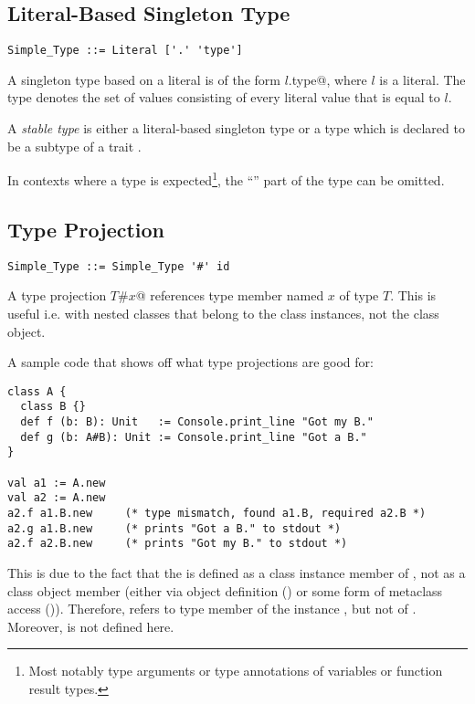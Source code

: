 \subsection{Literal-Based Singleton Type}
\label{sec:literal-based-singleton-type}

\syntax\begin{lstlisting}
Simple_Type ::= Literal ['.' 'type']
\end{lstlisting}

A singleton type based on a literal is of the form \lstinline@$l$.type@, where $l$ is a literal. The type denotes the set of values consisting of every literal value that is equal to $l$. 

A {\em stable type} is either a literal-based singleton type or a type which is declared to be a subtype of a trait . 

In contexts where a type is expected\footnote{Most notably type arguments or type annotations of variables or function result types.}, the ``'' part of the type can be omitted. 





\subsection{Type Projection}
\label{sec:type-projection}

\syntax\begin{lstlisting}
Simple_Type ::= Simple_Type '#' id
\end{lstlisting}

A type projection \lstinline@$T$#$x$@ references type member named $x$ of type $T$. This is useful i.e. with nested classes that belong to the class instances, not the class object. 

\example A sample code that shows off what type projections are good for:
\begin{lstlisting}
class A {
  class B {}
  def f (b: B): Unit   := Console.print_line "Got my B."
  def g (b: A#B): Unit := Console.print_line "Got a B."
}

val a1 := A.new
val a2 := A.new
a2.f a1.B.new     (* type mismatch, found a1.B, required a2.B *)
a2.g a1.B.new     (* prints "Got a B." to stdout *)
a2.f a2.B.new     (* prints "Got my B." to stdout *)
\end{lstlisting}
This is due to the fact that the  is defined as a class instance member of , not as a class object member (either via object definition () or some form of metaclass access ()). Therefore,  refers to type member  of the instance , but not of . Moreover,  is not defined here. 

